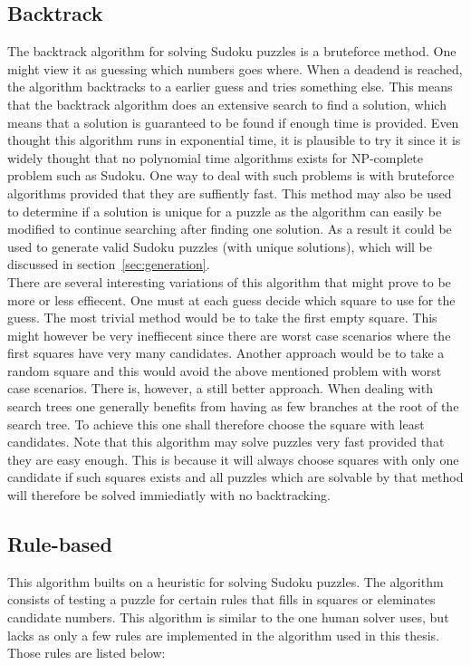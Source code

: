 \documentclass[a4paper,11pt]{kth-mag}
\begin{document}
\subsection{Backtrack}
The backtrack algorithm for solving Sudoku puzzles is a bruteforce method.
One might view it as guessing which numbers goes where.
When a deadend is reached, the algorithm backtracks to a earlier guess and tries something else.
This means that the backtrack algorithm does an extensive search to find a solution, which means that a solution is guaranteed to be found if enough time is provided.
Even thought this algorithm runs in exponential time, it is plausible to try it since it is widely thought that no polynomial time algorithms exists for NP-complete problem such as Sudoku. 
One way to deal with such problems is with bruteforce algorithms provided that they are suffiently fast.
This method may also be used to determine if a solution is unique for a puzzle as the algorithm can easily be modified to continue searching after finding one solution.
As a result it could be used to generate valid Sudoku puzzles (with unique solutions), which will be discussed in section~\ref{sec:generation}.\\
There are several interesting variations of this algorithm that might prove to be more or less effiecent.
One must at each guess decide which square to use for the guess.
The most trivial method would be to take the first empty square.
This might however be very ineffiecent since there are worst case scenarios where the first squares have very many candidates.
Another approach would be to take a random square and this would avoid the above mentioned problem with worst case scenarios.
There is, however, a still better approach.
When dealing with search trees one generally benefits from having as few branches at the root of the search tree.
To achieve this one shall therefore choose the square with least candidates.
Note that this algorithm may solve puzzles very fast provided that they are easy enough.
This is because it will always choose squares with only one candidate if such squares exists and all puzzles which are solvable by that method will therefore be solved immiediatly with no backtracking.

\FloatBarrier
\subsection{Rule-based}
\label{sec:rulebasedBackground}
This algorithm builts on a heuristic for solving Sudoku puzzles.
The algorithm consists of testing a puzzle for certain rules that fills in squares or eleminates candidate numbers.
This algorithm is similar to the one human solver uses, but lacks as only a few rules are implemented in the algorithm used in this thesis. Those rules are listed below:
\end{document}
